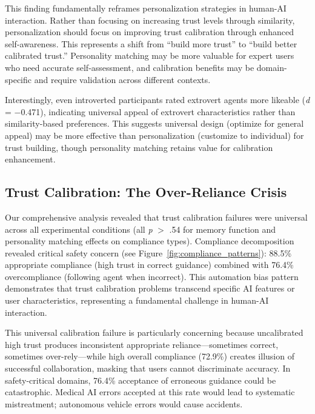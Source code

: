 \documentclass[12pt]{article}
\begin{document}
This finding fundamentally reframes personalization strategies in human-AI interaction. Rather than focusing on increasing trust levels through similarity, personalization should focus on improving trust calibration through enhanced self-awareness. This represents a shift from ``build more trust'' to ``build better calibrated trust.'' Personality matching may be more valuable for expert users who need accurate self-assessment, and calibration benefits may be domain-specific and require validation across different contexts.

Interestingly, even introverted participants rated extrovert agents more likeable (\textit{d} = $-$0.471), indicating universal appeal of extrovert characteristics rather than similarity-based preferences. This suggests universal design (optimize for general appeal) may be more effective than personalization (customize to individual) for trust building, though personality matching retains value for calibration enhancement.

\subsection{Trust Calibration: The Over-Reliance Crisis}

Our comprehensive analysis revealed that trust calibration failures were universal across all experimental conditions (all \textit{p} $>$ .54 for memory function and personality matching effects on compliance types). Compliance decomposition revealed critical safety concern (see Figure~\ref{fig:compliance_patterns}): 88.5\% appropriate compliance (high trust in correct guidance) combined with 76.4\% overcompliance (following agent when incorrect). This automation bias pattern \citep{parasuraman2010automation} demonstrates that trust calibration problems transcend specific AI features or user characteristics, representing a fundamental challenge in human-AI interaction.

This universal calibration failure is particularly concerning because uncalibrated high trust produces inconsistent appropriate reliance—sometimes correct, sometimes over-rely—while high overall compliance (72.9\%) creates illusion of successful collaboration, masking that users cannot discriminate accuracy. In safety-critical domains, 76.4\% acceptance of erroneous guidance could be catastrophic. Medical AI errors accepted at this rate would lead to systematic mistreatment; autonomous vehicle errors would cause accidents.
\end{document}
